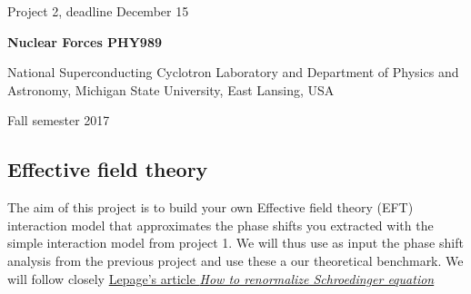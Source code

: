 \documentclass[%
oneside,                 %
final,                   %
10pt]{article}
\begin{document}

\newcommand{\exercisesection}[1]{\subsection*{#1}}






\thispagestyle{empty}

\begin{center}
{\LARGE\bf
\begin{spacing}{1.25}
Project 2, deadline  December 15
\end{spacing}
}
\end{center}


\begin{center}
{\bf Nuclear Forces PHY989}
\end{center}

    \begin{center}
\centerline{{\small National Superconducting Cyclotron Laboratory and Department of Physics and Astronomy, Michigan State University, East Lansing, USA}}
\end{center}
    

\begin{center}
Fall semester 2017
\end{center}

\vspace{1cm}


\subsection{Effective field theory}

The aim of this project is to build your own Effective field theory (EFT) interaction model that approximates the phase shifts you extracted with the simple interaction model from project 1. We will thus use as input the phase shift analysis from the previous project and use these a our theoretical benchmark.
We will follow closely \href{{https://arxiv.org/abs/nucl-th/9706029}}{Lepage's article {\it How to renormalize Schroedinger equation}}
\end{document}
